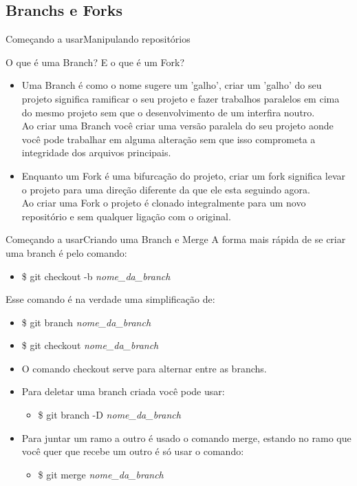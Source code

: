 \documentclass[10pt]{beamer}
\begin{document}
\subsection{Branchs e Forks}
\begin{frame}{Começando a usar}{Manipulando repositórios}
\begin{block}{O que é uma Branch? E o que é um Fork?}
  \begin{itemize}
    \item<1-> Uma Branch é como o nome sugere um 'galho', criar um 'galho' do seu projeto significa ramificar o seu projeto e fazer trabalhos paralelos em cima do mesmo projeto sem que o desenvolvimento de um interfira noutro.\\
    Ao criar uma Branch você criar uma versão paralela do seu projeto aonde você pode trabalhar em alguma alteração sem que isso comprometa a integridade dos arquivos principais. 
    \item<1-> Enquanto um Fork é uma bifurcação do projeto, criar um fork significa levar o projeto para uma direção diferente da que ele esta seguindo agora.\\
    Ao criar uma Fork o projeto é clonado integralmente para um novo repositório e sem qualquer ligação com o original.
  \end{itemize}
\end{block}
\end{frame}

\begin{frame}{Começando a usar}{Criando uma Branch e Merge}
A forma mais rápida de se criar uma branch é pelo comando:
\begin{itemize}
	\item \$ git checkout -b \textit{nome\_da\_branch}
\end{itemize}
Esse comando é na verdade uma simplificação de:
\begin{itemize}
	\item \$ git branch \textit{nome\_da\_branch}
	\item \$ git checkout \textit{nome\_da\_branch}
\end{itemize}
\vspace{10px}
\begin{itemize}
	\item O comando checkout serve para alternar entre as branchs.\\
	\item Para deletar uma branch criada você pode usar:
	\begin{itemize}
		\item {\small \$ git branch -D \textit{nome\_da\_branch}}
	\end{itemize}
	\item Para juntar um ramo a outro é usado o comando merge, estando no ramo que você quer que recebe um outro é só usar o comando:\\
	\begin{itemize}
		\item {\small \$ git merge \textit{nome\_da\_branch}}
	\end{itemize}
\end{itemize}
\end{frame}
\end{document}
